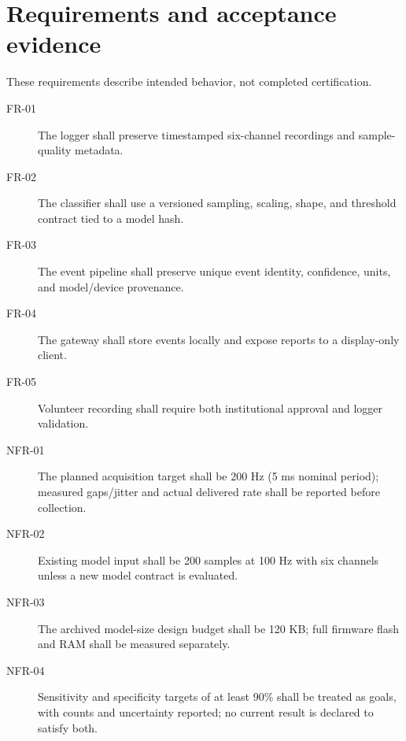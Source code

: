 \section{Requirements and acceptance evidence}
These requirements describe intended behavior, not completed certification.
\begin{description}
\item[FR-01] The logger shall preserve timestamped six-channel recordings and sample-quality metadata.
\item[FR-02] The classifier shall use a versioned sampling, scaling, shape, and threshold contract tied to a model hash.
\item[FR-03] The event pipeline shall preserve unique event identity, confidence, units, and model/device provenance.
\item[FR-04] The gateway shall store events locally and expose reports to a display-only client.
\item[FR-05] Volunteer recording shall require both institutional approval and logger validation.
\item[NFR-01] The planned acquisition target shall be 200 Hz (5 ms nominal period); measured gaps/jitter and actual delivered rate shall be reported before collection.
\item[NFR-02] Existing model input shall be 200 samples at 100 Hz with six channels unless a new model contract is evaluated.
\item[NFR-03] The archived model-size design budget shall be 120 KB; full firmware flash and RAM shall be measured separately.
\item[NFR-04] Sensitivity and specificity targets of at least 90\% shall be treated as goals, with counts and uncertainty reported; no current result is declared to satisfy both.
\end{description}
